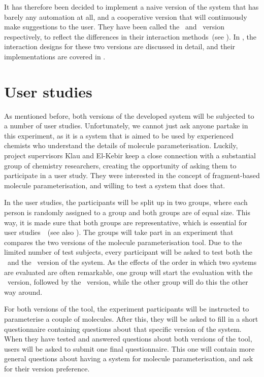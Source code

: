 It has therefore been decided to implement a naive version of the system that has barely any automation at all, and a cooperative version that will continuously make suggestions to the user. They have been called the \IDa\ and \IDb\ version respectively, to reflect the differences in their interaction methods~(see ). In , the interaction designs for these two versions are discussed in detail, and their implementations are covered in .



\section{User studies}
As mentioned before, both versions of the developed system will be subjected to a number of user studies. Unfortunately, we cannot just ask anyone partake in this experiment, as it is a system that is aimed to be used by experienced chemists who understand the details of molecule parameterisation. Luckily, project supervisors Klau and El-Kebir keep a close connection with a substantial group of chemistry researchers, creating the opportunity of asking them to participate in a user study. They were interested in the concept of fragment-based molecule parameterisation, and willing to test a system that does that.

In the user studies, the participants will be split up in two groups, where each person is randomly assigned to a group and both groups are of equal size. This way, it is made sure that both groups are representative, which is essential for user studies~\cite{wohlin2003empirical}~(see also ). The groups will take part in an experiment that compares the two versions of the molecule parameterisation tool. Due to the limited number of test subjects, every participant will be asked to test both the \IDa\ and the \IDb\ version of the system. As the effects of the order in which two systems are evaluated are often remarkable, one group will start the evaluation with the \IDa\ version, followed by the \IDb\ version, while the other group will do this the other way around.

For both versions of the tool, the experiment participants will be instructed to parameterise a couple of molecules. After this, they will be asked to fill in a short questionnaire containing questions about that specific version of the system. When they have tested and answered questions about both versions of the tool, users will be asked to submit one final questionnaire. This one will contain more general questions about having a system for molecule parameterisation, and ask for their version preference.

